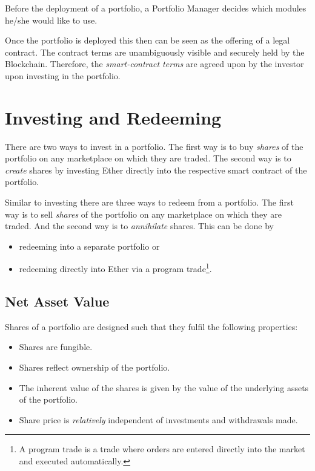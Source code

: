 \documentclass[9pt,oneside]{amsart}
\theoremstyle{plain}
\begin{document}
\begin{multicols}{2}
Before the deployment of a portfolio, a Portfolio Manager decides which modules he/she would like to use.

Once the portfolio is deployed this then can be seen as the offering of a legal contract. The contract terms are unambiguously visible and securely held by the Blockchain. Therefore, the \textit{smart-contract terms} are agreed upon by the investor upon investing in the portfolio.
	
\section{Investing and Redeeming}\label{sec:investing}

There are two ways to invest in a portfolio. The first way is to buy \textit{shares} of the portfolio on any marketplace on which they are traded. The second way is to \textit{create} shares by investing Ether directly into the respective smart contract of the portfolio.

Similar to investing there are three ways to redeem from a portfolio. The first way is to sell \textit{shares} of the portfolio on any marketplace on which they are traded. And the second way is to \textit{annihilate} shares.
This can be done by
\begin{itemize}
	\item redeeming into a separate portfolio or
	\item redeeming directly into Ether via a program trade\footnote{A program trade is a trade where orders are entered directly into the market and executed automatically.}.
\end{itemize}

\subsection{Net Asset Value}\label{sub:defshares}

Shares of a portfolio are designed such that they fulfil the following properties:
\begin{itemize}
	\item Shares are fungible.
	\item Shares reflect ownership of the portfolio.
	\item The inherent value of the shares is given by the value of the underlying assets of the portfolio.
	\item Share price is \textit{relatively} independent of investments and withdrawals made.
\end{itemize}


\end{multicols}
\end{document}
